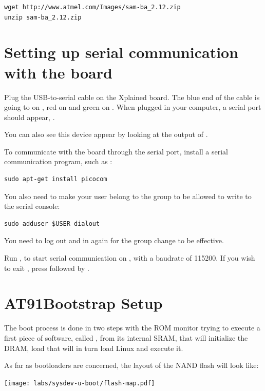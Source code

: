 \begin{verbatim}
wget http://www.atmel.com/Images/sam-ba_2.12.zip
unzip sam-ba_2.12.zip
\end{verbatim}

\section{Setting up serial communication with the board}

Plug the USB-to-serial cable on the Xplained board. The blue end of
the cable is going to  on , red on  and
green on . When plugged in your computer, a serial port
should appear, .

You can also see this device appear by looking at the output of
.

To communicate with the board through the serial port, install a
serial communication program, such as :

\begin{verbatim}
sudo apt-get install picocom
\end{verbatim}

You also need to make your user belong to the  group to be
allowed to write to the serial console:

\begin{verbatim}
sudo adduser $USER dialout
\end{verbatim}

You need to log out and in again for the group change to be effective.

Run , to start serial
communication on , with a baudrate of 115200. If
you wish to exit , press \code{[Ctrl][a]} followed by
\code{[Ctrl][x]}.

\section{AT91Bootstrap Setup}

The boot process is done in two steps with the ROM monitor trying to
execute a first piece of software, called , from
its internal SRAM, that will initialize the DRAM, load 
that will in turn load Linux and execute it.

As far as bootloaders are concerned, the layout of the NAND flash will
look like:

\begin{center}
  \texttt{[image: labs/sysdev-u-boot/flash-map.pdf]}
\end{center}

